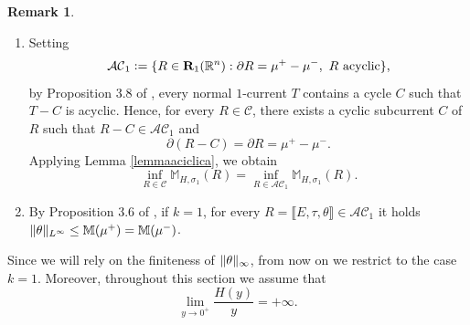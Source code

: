 \documentclass{article}
\numberwithin{equation}{section}
\theoremstyle{plain}%
\theoremstyle{definition}
\newtheorem{rem}[theorem]{Remark}
\theoremstyle{definition}
\newcommand{\rgrande}{\mathbb{R}}
\newcommand{\correttvar}[2]{\mathbf{R}_{#1}(\rgrande^{#2})}
\newcommand{\massa}{\mathbb{M}}
\newcommand{\massaanisotropauno}{\mathbb{M}_{H,\sigma_1}}
\DeclarePairedDelimiter{\norma}{\lVert}{\rVert} %
\begin{document}
\begin{rem}\label{remaciclicita}
    \begin{enumerate}
        \item Setting
$$
\mathcal{AC}_1 \vcentcolon = \{R \in \correttvar{1}{n}: \partial R = \mu^+ - \mu^- ,\ R \text{ acyclic}
\}
\text{,}
$$
by Proposition 3.8 of \cite{paolini_stepanov_2012}, every normal $1$-current $T$ contains a cycle $C$ such that $T-C$ is acyclic.
Hence, for every $R\in\mathcal C$, there exists a cyclic subcurrent $C$ of $R$ such that $R-C\in\mathcal{AC}_1$ and
$$
\partial(R-C)=\partial R=\mu^+-\mu^-.
$$
Applying Lemma \ref{lemmaaciclica}, we obtain
\begin{equation}\label{eq:uguaglianzainf}
\inf_{R \in \mathcal{C}}  \massaanisotropauno(R) = \inf_{R \in \mathcal{AC}_1}  \massaanisotropauno(R)
\text{.}
\end{equation}
        \item By Proposition 3.6 of \cite{cdm}, if $k = 1$, for every $R= \llbracket E,\tau,\theta \rrbracket \in\mathcal{A C}_1$ it holds $\norma{\theta}_{L^{\infty}} \leq \massa(\mu^+) = \massa (\mu^-)$.
    \end{enumerate}
\end{rem}
Since we will rely on the finiteness of $\norma{\theta}_{\infty}$, from now on we restrict to the case $k=1$. Moreover, throughout this section we assume that
\begin{equation}\label{eqderivatainfinita}
    \lim_{y \to 0^+} \frac{H(y)}{y} = + \infty
    \text{.}
\end{equation}
\end{document}
